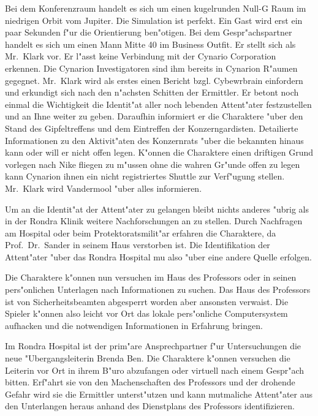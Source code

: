 Bei dem Konferenzraum handelt es sich um einen kugelrunden Null-G Raum im niedrigen Orbit vom Jupiter. Die Simulation ist perfekt. Ein Gast wird erst ein paar Sekunden f"ur die Orientierung ben"otigen. Bei dem Gespr"achspartner handelt es sich um einen Mann Mitte 40 im Business Outfit. Er stellt sich als Mr.~Klark vor. Er l"asst keine Verbindung mit der Cynario Corporation erkennen. Die Cynarion Investigatoren sind ihm bereits in Cynarion R"aumen gegegnet. Mr.~Klark wird als erstes einen Bericht bzgl. Cybewrbrain einfordern und erkundigt sich nach den n"achsten Schitten der Ermittler. Er betont noch einmal die Wichtigkeit die Identit"at aller noch lebenden Attent"ater festzustellen und an Ihne weiter zu geben. Daraufhin informiert er die Charaktere "uber den Stand des Gipfeltreffens und dem Eintreffen der Konzerngardisten. Detailierte Informationen zu den Aktivit"aten des Konzernrats "uber die bekannten hinaus kann oder will er nicht offen legen. K"onnen die Charaktere einen driftigen Grund vorlegen nach Nike fliegen zu m"ussen ohne die wahren Gr"unde offen zu legen kann Cynarion ihnen ein nicht registriertes Shuttle zur Verf"ugung stellen. Mr.~Klark wird Vandermool "uber alles informieren.


 Um an die Identit"at der Attent"ater zu gelangen bleibt nichts anderes "ubrig als in der Rondra Klinik weitere Nachforschungen an zu stellen. Durch Nachfragen am Hospital oder beim Protektoratsmilit"ar erfahren die Charaktere, da\3 Prof.~Dr.~Sander in seinem Haus verstorben ist. Die Identifikation der Attent"ater "uber das Rondra Hospital mu\3 also "uber eine andere Quelle erfolgen.

 Die Charaktere k"onnen nun versuchen im Haus des Professors oder in seinen pers"onlichen Unterlagen nach Informationen zu suchen. Das Haus des Professors ist von Sicherheitsbeamten abgesperrt worden aber ansonsten verwaist. Die Spieler k"onnen also leicht vor Ort das lokale pers"onliche Computersystem aufhacken und die notwendigen Informationen in Erfahrung bringen.

 Im Rondra Hospital ist der prim"are Ansprechpartner f"ur Untersuchungen die neue "Ubergangsleiterin Brenda Ben. Die Charaktere k"onnen versuchen die Leiterin vor Ort in ihrem B"uro abzufangen oder virtuell nach einem Gespr"ach bitten. Erf"ahrt sie von den Machenschaften des Professors und der drohende Gefahr wird sie die Ermittler unterst"utzen und kann mutma\3liche Attent"ater aus den Unterlangen heraus anhand des Dienstplans des Professors identifizieren.

